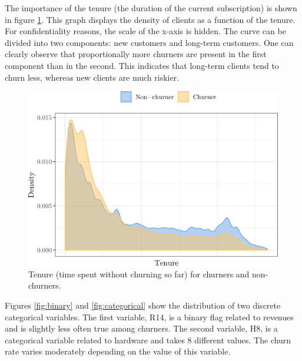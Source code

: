 The importance of the tenure (the duration of the current subscription) is shown
in figure \ref{fig:tenure}. This graph displays the density of clients as a
function of the tenure. For confidentiality reasons, the scale of the x-axis is
hidden. The curve can be divided into two components: new customers and
long-term customers. One can clearly observe that proportionally more churners
are present in the first component than in the second. This indicates that
long-term clients tend to churn less, whereas new clients are much riskier.

\begin{figure}
    \centering
	\includegraphics[width=0.9\linewidth]{figures/tenure.png}
	\caption{Tenure (time spent without churning so far) for churners and
	non-churners.}
	\label{fig:tenure}
\end{figure}

Figures \ref{fig:binary} and \ref{fig:categorical} show the distribution of two
discrete categorical variables. The first variable, R14, is a binary flag
related to revenues and is slightly less often true among churners. The second
variable, H8, is a categorical variable related to hardware and takes 8
different values. The churn rate varies moderately depending on the value of
this variable.

